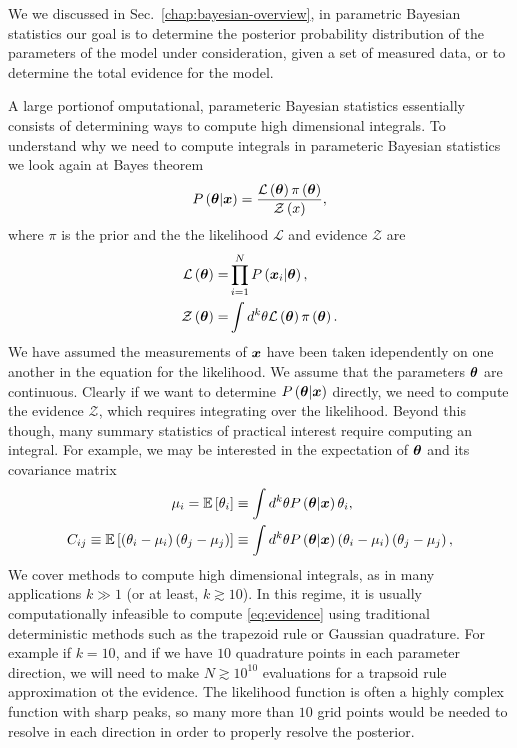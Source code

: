 We we discussed in Sec.~\ref{chap:bayesian-overview}, 
in parametric Bayesian statistics
our goal is to determine the posterior probability distribution of the
parameters of the model under consideration, given a set of measured data,
or to determine the total evidence for the model. 

A large portionof omputational, parameteric Bayesian statistics essentially consists of determining ways to compute high dimensional integrals.
To understand why we need to compute integrals in parameteric Bayesian statistics 
we look again at Bayes theorem
\begin{align}
    \label{eq:Bayes-theorem}
    P\left({\bm \theta}|{\bm x}\right)
    =
    \frac{
        \mathcal{L}\left({\bm \theta}\right)\pi\left({\bm \theta}\right)
    }{
        \mathcal{Z}\left(x\right)
    }
    ,
\end{align}
where $\pi$ is the prior and the the likelihood $\mathcal{L}$ and
evidence $\mathcal{Z}$ are
\begin{align}
    \label{eq:likelihood}
    \mathcal{L}\left({\bm \theta}\right)
    =&
    \prod_{i=1}^NP\left({\bm x}_i|{\bm \theta}\right)
    ,\\
    \label{eq:evidence}
    \mathcal{Z}\left({\bm \theta}\right)
    =&
    \int d^k\theta 
        \mathcal{L}\left({\bm \theta}\right)\pi\left({\bm \theta}\right)
    .
\end{align}
We have assumed the measurements of ${\bm x}$ have been taken idependently
on one another in the equation for the likelihood.
We assume that the parameters ${\bm \theta}$ are continuous.
Clearly if we want to determine $P\left({\bm \theta}|{\bm x}\right)$ directly, we need to compute the evidence $\mathcal{Z}$, which requires integrating over the likelihood.
Beyond this though, many summary statistics of practical interest require computing an integral.
For example, we may be interested in the expectation of ${\bm \theta}$ and its covariance matrix 
\begin{subequations}
\begin{align}
    \mu_i
    =
    \mathbb{E}\left[\theta_i\right]
    &\equiv
    \int d^k\theta P\left({\bm \theta}|{\bm x}\right)\theta_i 
    ,\\
    C_{ij}
    \equiv
    \mathbb{E}\left[\left(\theta_i-\mu_i\right)\left(\theta_j-\mu_j\right)\right]
    &\equiv
    \int d^k\theta P\left({\bm \theta}|{\bm x}\right)
        \left(\theta_i-\mu_i\right)\left(\theta_j-\mu_j\right) 
    ,
\end{align}
\end{subequations}
We cover methods to compute high dimensional integrals, as in many applications $k\gg1$ (or at least, $k\gtrsim10$).
In this regime, it is usually computationally infeasible to compute \eqref{eq:evidence} using traditional deterministic methods such as the trapezoid rule or Gaussian quadrature.
For example if $k=10$, and if we have $10$ quadrature points in each parameter direction, we will need to make $N\gtrsim 10^{10}$ evaluations for a trapsoid rule approximation ot the evidence.
The likelihood function is often a highly complex function with sharp peaks,
so many more than $10$ grid points would be needed to resolve in each direction
in order to properly resolve the posterior.

